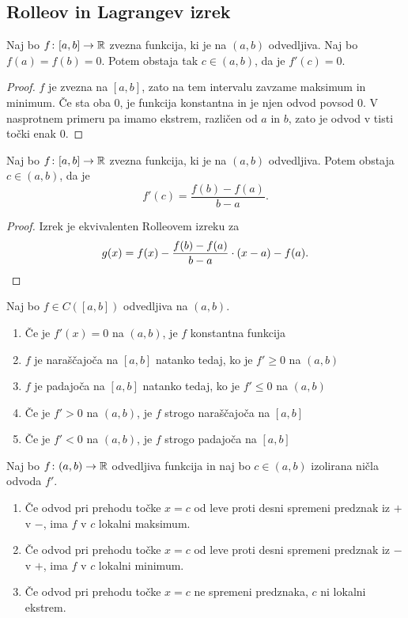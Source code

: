 \documentclass[12pt, a4paper]{article}
\begin{document}
\subsection{Rolleov in Lagrangev izrek}

\begin{izrek}[Rolle]
Naj bo $f\colon[a,b]\to\mathbb{R}$ zvezna funkcija, ki je na $(a,b)$ odvedljiva. Naj bo $f(a)=f(b)=0$. Potem obstaja tak $c\in(a,b)$, da je $f'(c)=0$.
\end{izrek}

\begin{proof}
$f$ je zvezna na $[a,b]$, zato na tem intervalu zavzame maksimum in minimum. Če sta oba $0$, je funkcija konstantna in je njen odvod povsod $0$. V nasprotnem primeru pa imamo ekstrem, različen od $a$ in $b$, zato je odvod v tisti točki enak $0$.
\end{proof}

\begin{izrek}[Lagrange]
Naj bo $f\colon[a,b]\to\mathbb{R}$ zvezna funkcija, ki je na $(a,b)$ odvedljiva. Potem obstaja $c\in(a,b)$, da je
\[
f'(c)=\frac{f(b)-f(a)}{b-a}.
\]
\end{izrek}

\begin{proof}
Izrek je ekvivalenten Rolleovem izreku za
\[
g(x)=f(x)-\frac{f(b)-f(a)}{b-a}\cdot (x-a)-f(a).\qedhere
\]
\end{proof}

\begin{posledica}\label{psl:lag}
Naj bo $f\in C\left([a,b]\right)$ odvedljiva na $(a,b)$.

\begin{enumerate}[label=\roman*)]
\item Če je $f'(x)=0$ na $(a,b)$, je $f$ konstantna funkcija
\item $f$ je naraščajoča na $[a,b]$ natanko tedaj, ko je $f'\geq 0$ na $(a,b)$
\item $f$ je padajoča na $[a,b]$ natanko tedaj, ko je $f'\leq 0$ na $(a,b)$
\item Če je $f'>0$ na $(a,b)$, je $f$ strogo naraščajoča na $[a,b]$
\item Če je $f'<0$ na $(a,b)$, je $f$ strogo padajoča na $[a,b]$
\end{enumerate}
\end{posledica}

\begin{posledica}
Naj bo $f\colon(a,b)\to\mathbb{R}$ odvedljiva funkcija in naj bo $c\in(a,b)$ izolirana ničla odvoda $f'$.

\begin{enumerate}[label=\roman*)]
\item Če odvod pri prehodu točke $x=c$ od leve proti desni spremeni predznak iz $+$ v $-$, ima $f$ v $c$ lokalni maksimum.
\item Če odvod pri prehodu točke $x=c$ od leve proti desni spremeni predznak iz $-$ v $+$, ima $f$ v $c$ lokalni minimum.
\item Če odvod pri prehodu točke $x=c$ ne spremeni predznaka, $c$ ni lokalni ekstrem.
\end{enumerate}
\end{posledica}
\end{document}
